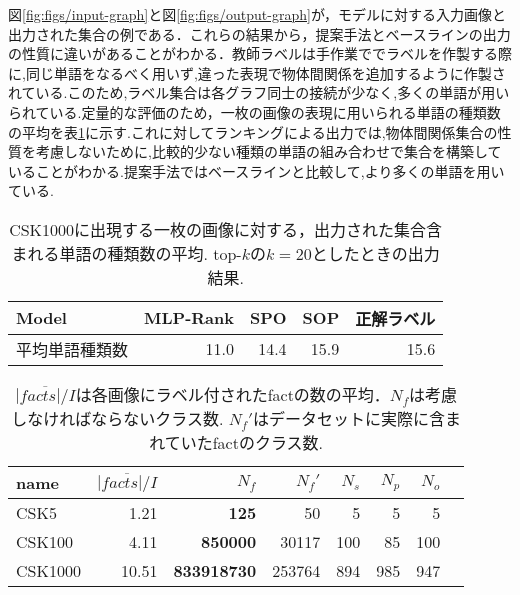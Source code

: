 図\ref{fig:figs/input-graph}と図\ref{fig:figs/output-graph}が，モデルに対する入力画像と出力された集合の例である．これらの結果から，提案手法とベースラインの出力の性質に違いがあることがわかる．教師ラベルは手作業ででラベルを作製する際に,同じ単語をなるべく用いず,違った表現で物体間関係を追加するように作製されている.このため,ラベル集合は各グラフ同士の接続が少なく,多くの単語が用いられている.定量的な評価のため，一枚の画像の表現に用いられる単語の種類数の平均を表\ref{table:mean-used-words}に示す.これに対してランキングによる出力では,物体間関係集合の性質を考慮しないために,比較的少ない種類の単語の組み合わせで集合を構築していることがわかる.提案手法ではベースラインと比較して,より多くの単語を用いている.
\begin{table}
\begin{center}
\caption{CSK1000に出現する一枚の画像に対する，出力された集合含まれる単語の種類数の平均. top-$k$の$k=20$としたときの出力結果.}
\label{table:mean-used-words}
\begin{tabular}{lrrrr}
\toprule
Model & MLP-Rank& SPO &  SOP & 正解ラベル\\
\midrule
平均単語種類数	& 11.0 	& 14.4 & 15.9 & 15.6\\
\bottomrule
\end{tabular}
\end{center}
\end{table}
\begin{table}
\begin{center}
\caption{$\overline{|facts|/I}$は各画像にラベル付されたfactの数の平均．$N_f$は考慮しなければならないクラス数. $N_f'$はデータセットに実際に含まれていたfactのクラス数.}
\label{table:dataset-stats}
\begin{tabular}{lrrrrrrr}
\toprule
name &      $\overline{|facts|/I}$ &  $N_f$ &  $N_f'$ &  $N_s$ &  $N_p$ &  $N_o$ \\
\midrule
CSK5              &   1.21 &             \textbf{125} &       50 &           5 &             5 &          5 \\
CSK100            &   4.11 &       \textbf{850000} &    30117 &         100 &            85 &        100 \\
CSK1000           &  10.51 &       \textbf{833918730} &   253764 &         894 &           985 &        947 \\
\bottomrule
\end{tabular}
\end{center}
\end{table}

